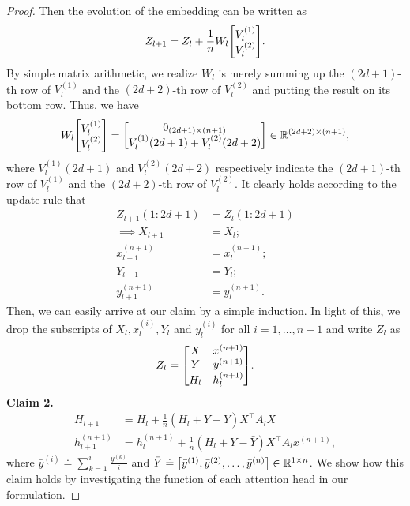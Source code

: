 \documentclass{article}
\newcommand{\R}{\mathbb{R}}
\begin{document}
\begin{proof}
    Then the evolution of the embedding can be written as
    \begin{align}
        Z_{l+1} = Z_l + \frac{1}{n} W_l \mqty[V_l^{(1)}\\
                                              V_l^{(2)}].
    \end{align}
    By simple matrix arithmetic, we realize $W_l$ is merely summing up the $(2d+1)$-th row of $V_l^{(1)}$ and the $(2d+2)$-th row of $V_l^{(2)}$ and putting the result on its bottom row.
    Thus, we have
    \begin{align}
        W_l \mqty[V_l^{(1)}\\
                  V_l^{(2)}]
         = \mqty[0_{(2d+1)\times(n+1)}\\
                 V_l^{(1)}(2d+1) + V_l^{(2)}(2d+2)] \in \R^{(2d+2) \times (n+1)},
    \end{align}
    where $V_l^{(1)}(2d+1)$ and $V_l^{(2)}(2d+2)$ respectively indicate the $(2d+1)$-th row of $V_l^{(1)}$ and the $(2d+2)$-th row of $V_l^{(2)}$.
    It clearly holds according to the update rule that
    \begin{align}
        Z_{l+1}(1:2d+1) &= Z_l (1: 2d+1)\\
        \implies X_{l+1} &= X_l;\\
        x_{l+1}^{(n+1)} &= x_l^{(n+1)};\\
        Y_{l+1} &= Y_l;\\
        y_{l+1}^{(n+1)} &= y_l^{(n+1)}.
    \end{align}
    Then, we can easily arrive at our claim by a simple induction.
    In light of this, we drop the subscripts of $X_l, x_l^{(i)}, Y_l$ and $y_l^{(i)}$ for all $i = 1, \dots, n+1$ and write $Z_l$ as
    \begin{align}
        Z_l = \mqty[X & x^{(n+1)}\\
                    Y & y^{(n+1)}\\
                    H_l & h_l^{(n+1)}].
    \end{align}
    \textbf{Claim 2.}
    \begin{align}
        H_{l+1} &= H_l + \frac{1}{n} (H_l + Y - \bar{Y}) X^\top A_l X\\
        h_{l+1}^{(n+1)} &= h_l^{(n+1)} + \frac{1}{n} (H_l + Y - \bar{Y}) X^\top A_l x^{(n+1)},
    \end{align}
    where $\bar{y}^{(i)} \doteq \sum_{k=1}^i \frac{y^{(k)}}{i}$ and $\bar{Y} \doteq \mqty[\bar{y}^{(1)}, \bar{y}^{(2)}, \dots, \bar{y}^{(n)}]\in \R^{1 \times n}$.
    We show how this claim holds by investigating the function of each attention head in our formulation.

\end{proof}
\end{document}
